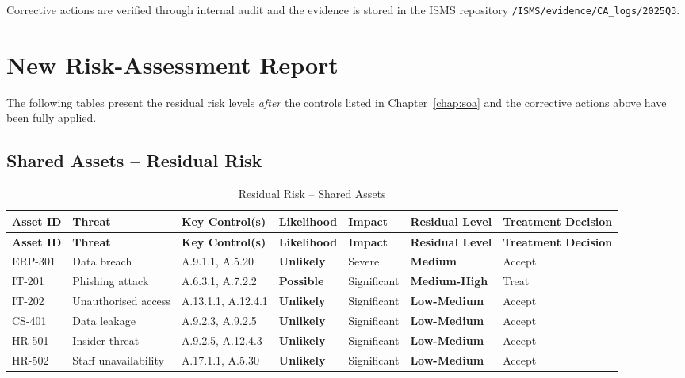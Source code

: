 Corrective actions are verified through internal audit and the evidence is stored in the ISMS repository \texttt{/ISMS/evidence/CA\_logs/2025Q3}.

\section{New Risk-Assessment Report}
\label{sec:new_risk_assessment}

The following tables present the residual risk levels \emph{after} the controls
listed in Chapter~\ref{chap:soa} and the corrective actions above have been
fully applied.

\subsection{Shared Assets -- Residual Risk}
\label{subsec:shared_residual}

\begin{longtable}{|p{1.5cm}|p{2cm}|p{2cm}|p{2cm}|p{2cm}|p{2cm}|p{2cm}|}
  \caption{Residual Risk -- Shared Assets\label{tab:shared_residual}}\\
  \hline
  \textbf{Asset ID} & \textbf{Threat} & \textbf{Key Control(s)} & \textbf{Likelihood} & \textbf{Impact} & \textbf{Residual Level} & \textbf{Treatment Decision}\\
  \hline
  \endfirsthead
  \hline
  \textbf{Asset ID} & \textbf{Threat} & \textbf{Key Control(s)} & \textbf{Likelihood} & \textbf{Impact} & \textbf{Residual Level} & \textbf{Treatment Decision}\\
  \hline
  \endhead
  ERP-301 & Data breach & A.9.1.1, A.5.20 & \textbf{Unlikely} & Severe & \textbf{Medium} & Accept\\
  \hline
  IT-201  & Phishing attack & A.6.3.1, A.7.2.2 & \textbf{Possible} & Significant & \textbf{Medium-High}\footnotemark & Treat\\
  \hline
  IT-202  & Unauthorised access & A.13.1.1, A.12.4.1 & \textbf{Unlikely} & Significant & \textbf{Low-Medium} & Accept\\
  \hline
  CS-401  & Data leakage & A.9.2.3, A.9.2.5 & \textbf{Unlikely} & Significant & \textbf{Low-Medium} & Accept\\
  \hline
  HR-501  & Insider threat & A.9.2.5, A.12.4.3 & \textbf{Unlikely} & Significant & \textbf{Low-Medium} & Accept\\
  \hline
  HR-502  & Staff unavailability & A.17.1.1, A.5.30 & \textbf{Unlikely} & Significant & \textbf{Low-Medium} & Accept\\
  \hline
\end{longtable}

